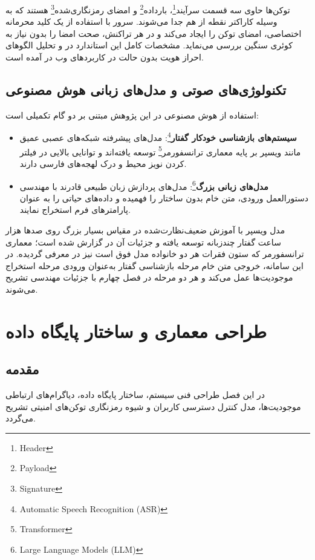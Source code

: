 \documentclass[11pt, a4paper]{report}
\newcommand{\enfootnote}[1]{\footnote{\foreignlanguage{english}{#1}}}
\begin{document}
توکن‌ها حاوی سه قسمت سرآیند\enfootnote{Header}، بارداده\enfootnote{Payload} و امضای رمزنگاری‌شده\enfootnote{Signature} هستند که به وسیله کاراکتر نقطه از هم جدا می‌شوند. سرور با استفاده از یک کلید محرمانه اختصاصی، امضای توکن را ایجاد می‌کند و در هر تراکنش، صحت امضا را بدون نیاز به کوئری سنگین بررسی می‌نماید. مشخصات کامل این استاندارد در \cite{jwt} و تحلیل الگوهای احراز هویت بدون حالت در کاربردهای وب در \cite{auth} آمده است.

\section{تکنولوژی‌های صوتی و مدل‌های زبانی هوش مصنوعی}
استفاده از هوش مصنوعی در این پژوهش مبتنی بر دو گام تکمیلی است:
\begin{itemize}
    \item \textbf{سیستم‌های بازشناسی خودکار گفتار}\enfootnote{Automatic Speech Recognition (ASR)}: مدل‌های پیشرفته شبکه‌های عصبی عمیق مانند ویسپر بر پایه معماری ترانسفورمر\enfootnote{Transformer} توسعه یافته‌اند و توانایی بالایی در فیلتر کردن نویز محیط و درک لهجه‌های فارسی دارند.
    \item \textbf{مدل‌های زبانی بزرگ}\enfootnote{Large Language Models (LLM)}: مدل‌های پردازش زبان طبیعی قادرند با مهندسی دستورالعمل ورودی، متن خام بدون ساختار را فهمیده و داده‌های حیاتی را به عنوان پارامترهای فرم استخراج نمایند.
\end{itemize}

مدل ویسپر با آموزش ضعیف‌نظارت‌شده در مقیاس بسیار بزرگ روی صدها هزار ساعت گفتار چندزبانه توسعه یافته و جزئیات آن در \cite{whisper} گزارش شده است؛ معماری ترانسفورمر که ستون فقرات هر دو خانواده مدل فوق است نیز در \cite{transformer} معرفی گردیده. در این سامانه، خروجی متن خام مرحله بازشناسی گفتار به‌عنوان ورودی مرحله استخراج موجودیت‌ها عمل می‌کند و هر دو مرحله در فصل چهارم با جزئیات مهندسی تشریح می‌شوند.

\chapter{طراحی معماری و ساختار پایگاه داده}

\section{مقدمه}
در این فصل طراحی فنی سیستم، ساختار پایگاه داده، دیاگرام‌های ارتباطی موجودیت‌ها، مدل کنترل دسترسی کاربران و شیوه رمزنگاری توکن‌های امنیتی تشریح می‌گردد.
\end{document}
